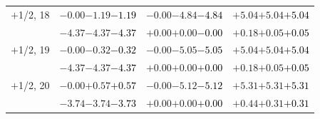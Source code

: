\documentclass[compress]{beamer}
\begin{document}
\begin{frame}
\begin{tabular}{r | c | c | c}
$+$1/2, 18 & $-0.00$\hspace{0.1 cm}$-1.19$\hspace{0.1 cm}\textcolor{black}{$-1.19$} & $-0.00$\hspace{0.1 cm}$-4.84$\hspace{0.1 cm}\textcolor{black}{$-4.84$} & $+5.04$\hspace{0.1 cm}$+5.04$\hspace{0.1 cm}\textcolor{black}{$+5.04$} \\
           & $-4.37$\hspace{0.1 cm}$-4.37$\hspace{0.1 cm}\textcolor{black}{$-4.37$} & $+0.00$\hspace{0.1 cm}$+0.00$\hspace{0.1 cm}\textcolor{black}{$-0.00$} & $+0.18$\hspace{0.1 cm}$+0.05$\hspace{0.1 cm}\textcolor{black}{$+0.05$} \\
$+$1/2, 19 & $-0.00$\hspace{0.1 cm}$-0.32$\hspace{0.1 cm}\textcolor{black}{$-0.32$} & $-0.00$\hspace{0.1 cm}$-5.05$\hspace{0.1 cm}\textcolor{black}{$-5.05$} & $+5.04$\hspace{0.1 cm}$+5.04$\hspace{0.1 cm}\textcolor{black}{$+5.04$} \\
           & $-4.37$\hspace{0.1 cm}$-4.37$\hspace{0.1 cm}\textcolor{black}{$-4.37$} & $+0.00$\hspace{0.1 cm}$+0.00$\hspace{0.1 cm}\textcolor{black}{$+0.00$} & $+0.18$\hspace{0.1 cm}$+0.05$\hspace{0.1 cm}\textcolor{black}{$+0.05$} \\
$+$1/2, 20 & $-0.00$\hspace{0.1 cm}$+0.57$\hspace{0.1 cm}\textcolor{black}{$+0.57$} & $-0.00$\hspace{0.1 cm}$-5.12$\hspace{0.1 cm}\textcolor{black}{$-5.12$} & $+5.31$\hspace{0.1 cm}$+5.31$\hspace{0.1 cm}\textcolor{black}{$+5.31$} \\
           & $-3.74$\hspace{0.1 cm}$-3.74$\hspace{0.1 cm}\textcolor{black}{$-3.73$} & $+0.00$\hspace{0.1 cm}$+0.00$\hspace{0.1 cm}\textcolor{black}{$+0.00$} & $+0.44$\hspace{0.1 cm}$+0.31$\hspace{0.1 cm}\textcolor{black}{$+0.31$} \\

\end{tabular}
\end{frame}
\end{document}
